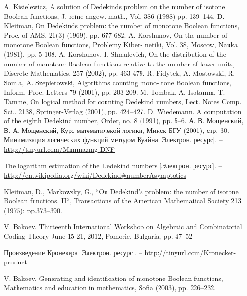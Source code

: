 

\begin{thebibliography}{9}
 A. Kisielewicz, A solution of Dedekinds problem on the number of isotone Boolean
functions, J. reine angew. math., Vol. 386 (1988) pp. 139--144.
 D. Kleitman, On Dedekinds problem: the number of monotone Boolean functions,
Proc. of AMS, 21(3) (1969), pp. 677-682.
 A. Korshunov, On the number of monotone Boolean functions, Problemy Kiber-
netiki, Vol. 38, Moscow, Nauka (1981), pp. 5-108.
 A. Korshunov, I. Shmulevich, On the distribution of the number of monotone
Boolean functions relative to the number of lower units, Discrete Mathematics,
257 (2002), pp. 463-479.
 R. Fidytek, A. Mostowski, R. Somla, A. Szepietowski, Algorithms counting mono-
tone Boolean functions, Inform. Proc. Letters 79 (2001), pp. 203-209.
 M. Tombak, A. Isotamm, T. Tamme, On logical method for counting Dedekind
numbers, Lect. Notes Comp. Sci., 2138, Springer-Verlag (2001), pp. 424--427.
 D. Wiedemann, A computation of the eighth Dedekind number, Order, no. 8
(1991), pp. 5--6.
 А. В. Мощенский, В. А. Мощенский, Курс математичекой логики, Минск БГУ (2001),
стр. 30.
 Минимизация логических функций методом Куайна [Электрон. ресурс]. -- 
  \underline{http://tinyurl.com/Minimazing-DNF}

 The logarithm estimation of the Dedekind numbers [Электрон. ресурс]. -- 
 \underline{http://en.wikipedia.org/wiki/Dedekind\#numberAsymptotics}  

Kleitman, D., Markowsky, G.,
``On Dedekind's problem: the number of isotone Boolean functions. II``, Transactions of the American Mathematical Society 213 (1975): pp.373–390.  

  

V. Bakoev, Thirteenth International Workshop on Algebraic and Combinatorial Coding Theory
June 15-21, 2012, Pomorie, Bulgaria, pp. 47--52

 Произведение Кронекера [Электрон. ресурс]. -- 
  \underline{http://tinyurl.com/Kronecker-product}
  
V. Bakoev, Generating and identification 
	of monotone Boolean functions, Mathematics 
	and education in mathematics, 
	Sofia (2003), pp. 226--232.


\end{thebibliography}

